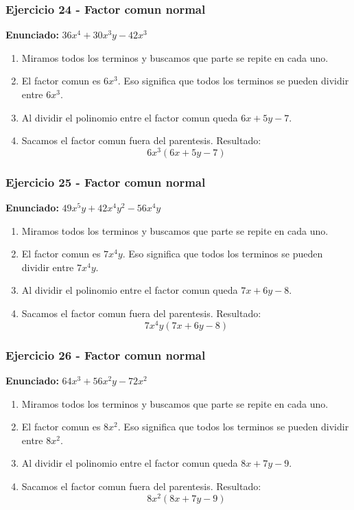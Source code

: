 \documentclass[11pt,a4paper]{article}
\begin{document}
\vspace{0.2cm}
\subsubsection*{Ejercicio 24 - Factor comun normal}
\textbf{Enunciado:} $ 36 x^{4} + 30 x^{3} y - 42 x^{3} $\par
\begin{enumerate}[leftmargin=2em]
\item Miramos todos los terminos y buscamos que parte se repite en cada uno.
\item El factor comun es \(6 x^{3}\). Eso significa que todos los terminos se pueden dividir entre \(6 x^{3}\).
\item Al dividir el polinomio entre el factor comun queda \(6 x + 5 y - 7\).
\item Sacamos el factor comun fuera del parentesis. Resultado: \[\boxed{6 x^{3}\left(6 x + 5 y - 7\right)}\]
\end{enumerate}

\vspace{0.2cm}
\subsubsection*{Ejercicio 25 - Factor comun normal}
\textbf{Enunciado:} $ 49 x^{5} y + 42 x^{4} y^{2} - 56 x^{4} y $\par
\begin{enumerate}[leftmargin=2em]
\item Miramos todos los terminos y buscamos que parte se repite en cada uno.
\item El factor comun es \(7 x^{4} y\). Eso significa que todos los terminos se pueden dividir entre \(7 x^{4} y\).
\item Al dividir el polinomio entre el factor comun queda \(7 x + 6 y - 8\).
\item Sacamos el factor comun fuera del parentesis. Resultado: \[\boxed{7 x^{4} y\left(7 x + 6 y - 8\right)}\]
\end{enumerate}

\vspace{0.2cm}
\subsubsection*{Ejercicio 26 - Factor comun normal}
\textbf{Enunciado:} $ 64 x^{3} + 56 x^{2} y - 72 x^{2} $\par
\begin{enumerate}[leftmargin=2em]
\item Miramos todos los terminos y buscamos que parte se repite en cada uno.
\item El factor comun es \(8 x^{2}\). Eso significa que todos los terminos se pueden dividir entre \(8 x^{2}\).
\item Al dividir el polinomio entre el factor comun queda \(8 x + 7 y - 9\).
\item Sacamos el factor comun fuera del parentesis. Resultado: \[\boxed{8 x^{2}\left(8 x + 7 y - 9\right)}\]
\end{enumerate}
\end{document}
